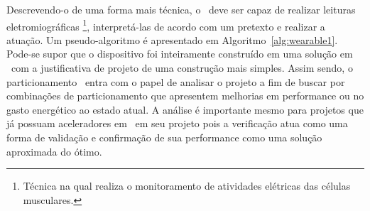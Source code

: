          Descrevendo-o de uma forma mais técnica, o \wearable\ deve ser capaz de realizar leituras eletromiográficas%
         \footnote{Técnica na qual realiza o monitoramento de atividades elétricas das células musculares.},
         interpretá-las de acordo com um pretexto e realizar a atuação.
         Um pseudo-algoritmo é apresentado em Algoritmo~\ref{alg:wearable1}.
         Pode-se supor que o dispositivo foi inteiramente construído em uma solução em \software\ com a justificativa de projeto de uma construção mais simples.
         Assim sendo, o particionamento \hs\ entra com o papel de analisar o projeto a fim de buscar por combinações de particionamento que apresentem melhorias em performance ou no gasto energético ao estado atual.
         A análise é importante mesmo para projetos que já possuam aceleradores em \hardware\ em seu projeto pois a verificação atua como uma forma de validação e confirmação de sua performance como uma solução aproximada do ótimo.

         \begin{algorithm}[h]

            \BlankLine


            \caption{\Wearable\ 1 - Procedimentos realizados pelo dispositivo \wearable\ denominado Mão Biônica.}
            \label{alg:wearable1}
         \end{algorithm}

